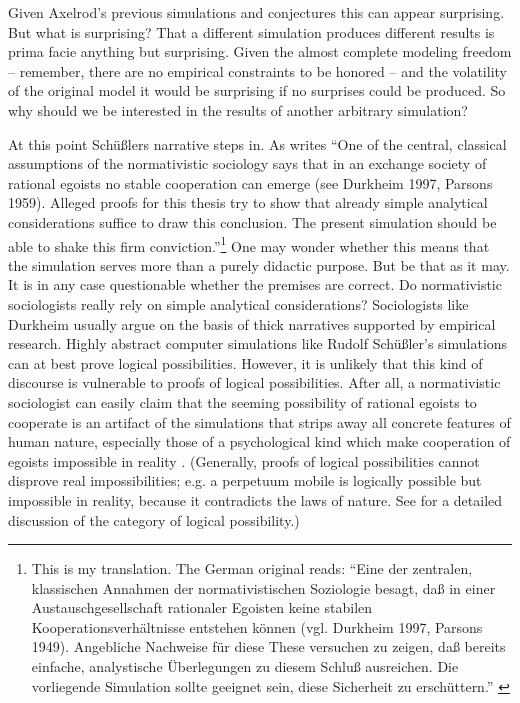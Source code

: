 \documentclass[graybox, English]{svmult}
\begin{document}
Given Axelrod's previous simulations and conjectures this can appear
surprising. But what is surprising? That a different simulation
produces different results is prima facie anything but
surprising. Given the almost complete modeling freedom -- remember,
there are no empirical constraints to be honored -- and the volatility
of the original model it would be surprising if no surprises could be
produced. So why should we be interested in the results of another
arbitrary simulation?

At this point Schüßlers narrative steps in. As
\citet[91]{schuessler:1990} writes ``One of the central, classical
assumptions of the normativistic sociology says that in an exchange
society of rational egoists no stable cooperation can emerge (see
Durkheim 1997, Parsons 1959). Alleged proofs for this thesis try to
show that already simple analytical considerations suffice to draw
this conclusion. The present simulation should be able to shake this
firm conviction.''\footnote{This is my translation. The German
  original reads: ``Eine der zentralen, klassischen Annahmen der
  normativistischen Soziologie besagt, daß in einer
  Austauschgesellschaft rationaler Egoisten keine stabilen
  Kooperationsverhältnisse entstehen können (vgl. Durkheim 1997,
  Parsons 1949). Angebliche Nachweise für diese These versuchen zu
  zeigen, daß bereits einfache, analystische Überlegungen zu diesem
  Schluß ausreichen. Die vorliegende Simulation sollte geeignet sein,
  diese Sicherheit zu erschüttern.'' \citep[91]{schuessler:1990}} 
One may wonder whether this
means that the simulation serves more than a purely didactic
purpose. But be that as it may. It is in any case questionable whether
the premises are correct. Do normativistic sociologists really rely on
simple analytical considerations? Sociologists like Durkheim usually
argue on the basis of thick narratives supported by empirical
research. Highly abstract computer simulations like Rudolf
Schüßler's simulations can at best prove logical possibilities. However, it is
unlikely that this kind of discourse is vulnerable to proofs of
logical possibilities. After all, a normativistic sociologist can
easily claim that the seeming possibility of rational egoists to
cooperate is an artifact of the simulations that strips away all
concrete features of human nature, especially those of a psychological
kind which make cooperation of egoists impossible in reality
\citep[128ff.]{arnold:2013b}. (Generally, proofs of logical
possibilities cannot disprove real impossibilities; e.g. a perpetuum
mobile is logically possible but impossible in reality, because it
contradicts the laws of nature. See \citet{arnold:2013b} for a detailed
discussion of the category of logical possibility.)
\end{document}
